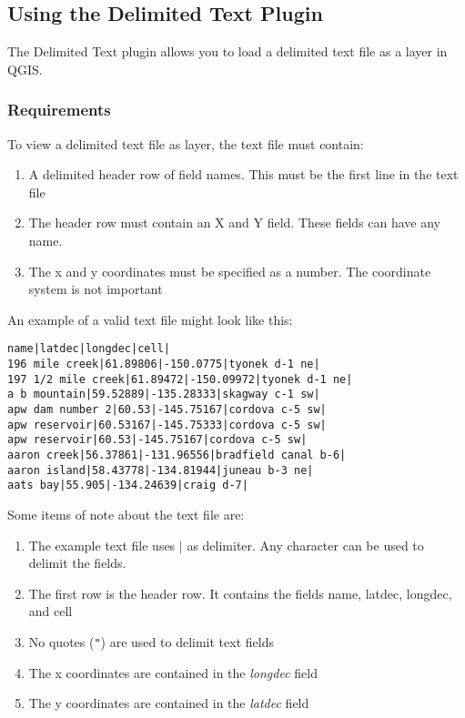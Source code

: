     
\subsection{Using the Delimited Text Plugin}\label{label_dltext}    

The Delimited Text plugin allows you to load a delimited text file  as a layer
in QGIS. 
    
\subsubsection{Requirements}

To view a delimited text file as layer, the text file must contain:

\begin{enumerate}      
\item A delimited header row of field names. This must be the first line in
the text file     
\item The header row must contain an X and Y field. These fields can have any
name.
\item The x and y coordinates must be specified as a number. The coordinate
system is not important
\end{enumerate}

An example of a valid text file might look like this:

\begin{verbatim} 
name|latdec|longdec|cell|
196 mile creek|61.89806|-150.0775|tyonek d-1 ne|
197 1/2 mile creek|61.89472|-150.09972|tyonek d-1 ne|
a b mountain|59.52889|-135.28333|skagway c-1 sw|
apw dam number 2|60.53|-145.75167|cordova c-5 sw|
apw reservoir|60.53167|-145.75333|cordova c-5 sw|
apw reservoir|60.53|-145.75167|cordova c-5 sw|
aaron creek|56.37861|-131.96556|bradfield canal b-6|
aaron island|58.43778|-134.81944|juneau b-3 ne|
aats bay|55.905|-134.24639|craig d-7|
\end{verbatim}


Some items of note about the text file are:

\begin{enumerate}        
\item  The example text file uses \mbox{$|$} as delimiter. Any character can
be used to delimit the fields.
\item The first row is the header row. It contains the fields name, latdec,
longdec, and cell
\item No quotes ({\tt{}"{}}) are used to delimit text fields
\item The x coordinates are contained in the {\em longdec} field
\item The y coordinates are contained in the {\em latdec} field
\end{enumerate}

